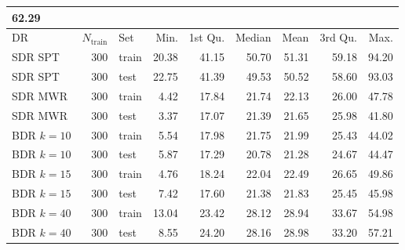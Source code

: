 \begin{table}[ht]
\begin{tabular}{lrrlrrrrrr}
  62.29 \\ 
  \midrule
  DR & & $N_{\text{train}}$ & Set & Min. & 1st Qu. & Median & Mean & 
    3rd Qu. & Max. \\ 
    \midrule
  \multicolumn{2}{l}{SDR SPT} & 300 & train & 20.38 & 41.15 & 50.70 & 51.31 & 
  59.18 & 94.20 \\ 
  \multicolumn{2}{l}{SDR SPT} & 300 & test & 22.75 & 41.39 & 49.53 & 50.52 & 
  58.60 & 93.03 \\ 
  \multicolumn{2}{l}{SDR MWR} & 300 & train & 4.42 & 17.84 & 21.74 & 22.13 & 
  26.00 & 47.78 \\ 
  \multicolumn{2}{l}{SDR MWR} & 300 & test & 3.37 & 17.07 & 21.39 & 21.65 & 
  25.98 & 41.80 \\ 
  \multicolumn{2}{l}{BDR $k=10$} & 300 & train & 5.54 & 17.98 & 21.75 & 21.99 & 
  25.43 & 44.02 \\ 
  \multicolumn{2}{l}{BDR $k=10$} & 300 & test & 5.87 & 17.29 & 20.78 & 21.28 & 
  24.67 & 44.47 \\ 
  \multicolumn{2}{l}{BDR $k=15$} & 300 & train & 4.76 & 18.24 & 22.04 & 22.49 & 
  26.65 & 49.86 \\ 
  \multicolumn{2}{l}{BDR $k=15$} & 300 & test & 7.42 & 17.60 & 21.38 & 21.83 & 
  25.45 & 45.98 \\ 
  \multicolumn{2}{l}{BDR $k=40$} & 300 & train & 13.04 & 23.42 & 28.12 & 28.94 
  & 33.67 & 54.98 \\ 
  \multicolumn{2}{l}{BDR $k=40$} & 300 & test & 8.55 & 24.20 & 28.16 & 28.98 & 
  33.20 & 57.21 \\ 
  \bottomrule
\end{tabular}
\end{table}